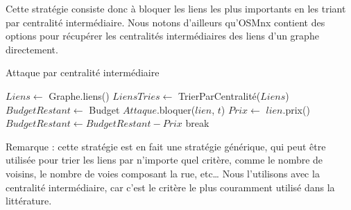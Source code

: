 Cette stratégie consiste donc à bloquer les liens les plus importants en les triant par centralité intermédiaire.
Nous notons d'ailleurs qu'OSMnx contient des options pour récupérer les centralités intermédiaires des liens d'un graphe directement.
\begin{algorithm}[H]
\caption{Attaque par centralité intermédiaire}
\begin{algorithmic}
\State $Liens \gets$ Graphe.liens()
\State $LiensTries \gets$ TrierParCentralité($Liens$)
\State $BudgetRestant \gets$ Budget
\State $Attaque$.bloquer($lien$, $t$)
\State $Prix \gets$ $lien$.prix()
\State $BudgetRestant \gets BudgetRestant - Prix$
\State break
\EndIf
\EndFor
\EndFor
\end{algorithmic}
\end{algorithm}

Remarque : cette stratégie est en fait une stratégie générique, qui peut être utilisée pour trier les liens par n'importe quel critère, comme le nombre de voisins, le nombre de voies composant la rue, etc\dots
Nous l'utilisons avec la centralité intermédiaire, car c'est le critère le plus couramment utilisé dans la littérature.